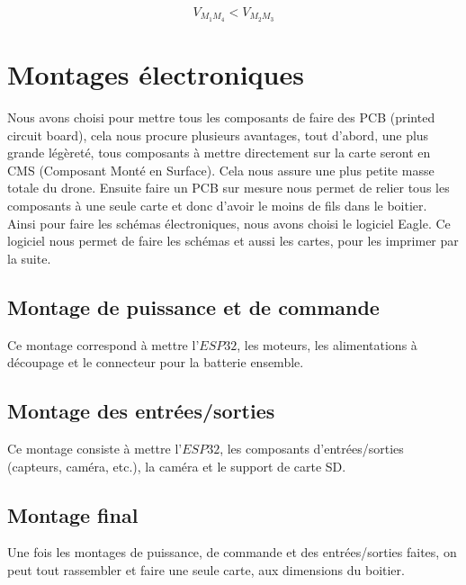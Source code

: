 \documentclass{rapport}
\begin{document}
$$ V_{M_1M_4} < V_{M_2M_3}$$

\section{Montages électroniques}
Nous avons choisi pour mettre tous les composants de faire des PCB (printed circuit board), cela nous procure plusieurs avantages, tout d'abord, une plus grande légèreté, tous composants à mettre directement sur la carte seront en CMS (Composant Monté en Surface). Cela nous assure une plus petite masse totale du drone. Ensuite faire un PCB sur mesure nous permet de relier tous les composants à une seule carte et donc d'avoir le moins de fils dans le boitier. \\

Ainsi pour faire les schémas électroniques, nous avons choisi le logiciel Eagle. Ce logiciel nous permet de faire les schémas et aussi les cartes, pour les imprimer par la suite.

\subsection{Montage de puissance et de commande}
Ce montage correspond à mettre l'$ESP32$, les moteurs, les alimentations à découpage et le connecteur pour la batterie ensemble.

\subsection{Montage des entrées/sorties}
Ce montage consiste à mettre l'$ESP32$, les composants d'entrées/sorties (capteurs, caméra, etc.), la caméra et le support de carte SD.

\subsection{Montage final}
Une fois les montages de puissance, de commande et des entrées/sorties faites, on peut tout rassembler et faire une seule carte, aux dimensions du boitier.
\end{document}
